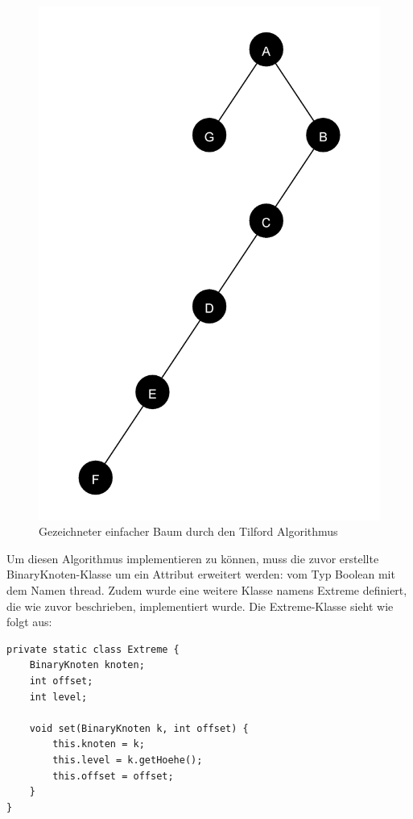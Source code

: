 \begin{figure}[H]
    \centering
    \includegraphics[scale = 0.07]{abbildungen/baum_algo_3_n2}
    \caption{Gezeichneter einfacher Baum durch den Tilford Algorithmus}
    \label{pic:baum_algo_3_n2} 
\end{figure}

Um diesen Algorithmus implementieren zu können, muss die zuvor erstellte BinaryKnoten-Klasse um ein 
Attribut erweitert werden: vom Typ Boolean mit dem Namen \glqq thread\grqq{}. Zudem wurde eine weitere Klasse 
namens \glqq Extreme\grqq{} definiert, die wie zuvor beschrieben, implementiert wurde. Die Extreme-Klasse sieht wie folgt aus:

\begin{lstlisting}[caption=Implementierung der Extreme-Klasse, label=code:algo3_extreme]
private static class Extreme {
    BinaryKnoten knoten;
    int offset;
    int level;
    
    void set(BinaryKnoten k, int offset) {
        this.knoten = k;
        this.level = k.getHoehe();
        this.offset = offset;
    }
}
\end{lstlisting}

